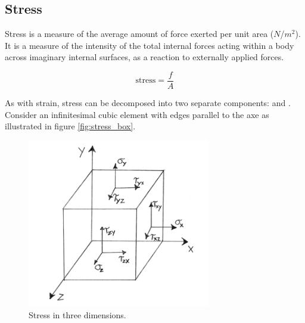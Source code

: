 \subsection{Stress}
\label{sec:physics_stress}
Stress is a measure of the average amount of force exerted per unit
area ($N$/$m^2$). It is a measure of the intensity of the total
internal forces acting within a body across imaginary internal
surfaces, as a reaction to externally applied forces.

\begin{equation}
\mbox{stress} = \frac{f}{A}
\end{equation}


As with strain, stress can be decomposed into two separate components:
 and .
Consider an infinitesimal cubic element with
edges parallel to the axe as illustrated in figure
\vref{fig:stress_box}.


\begin{figure}
  \centering
  \includegraphics[width=8cm]{./images/physics_stress_box.png}
\caption{Stress in three dimensions.}
\label{fig:stress_box}
\end{figure}

